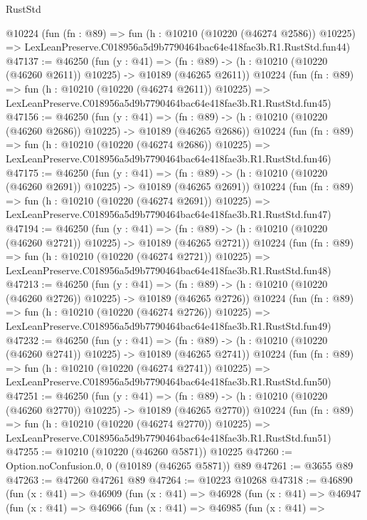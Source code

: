 \begin{lexlean}{RustStd}
\begin{coremodule}
    @10224
    (fun (fn : @89) =>
    fun (h : @10210 (@10220 (@46274 @2586)) @10225) =>
    LexLeanPreserve.C018956a5d9b7790464bac64e418fae3b.R1.RustStd.fun44)
@47137 := @46250
    (fun (y : @41) =>
    (fn : @89) -> (h : @10210 (@10220 (@46260 @2611)) @10225) -> @10189 (@46265 @2611))
    @10224
    (fun (fn : @89) =>
    fun (h : @10210 (@10220 (@46274 @2611)) @10225) =>
    LexLeanPreserve.C018956a5d9b7790464bac64e418fae3b.R1.RustStd.fun45)
@47156 := @46250
    (fun (y : @41) =>
    (fn : @89) -> (h : @10210 (@10220 (@46260 @2686)) @10225) -> @10189 (@46265 @2686))
    @10224
    (fun (fn : @89) =>
    fun (h : @10210 (@10220 (@46274 @2686)) @10225) =>
    LexLeanPreserve.C018956a5d9b7790464bac64e418fae3b.R1.RustStd.fun46)
@47175 := @46250
    (fun (y : @41) =>
    (fn : @89) -> (h : @10210 (@10220 (@46260 @2691)) @10225) -> @10189 (@46265 @2691))
    @10224
    (fun (fn : @89) =>
    fun (h : @10210 (@10220 (@46274 @2691)) @10225) =>
    LexLeanPreserve.C018956a5d9b7790464bac64e418fae3b.R1.RustStd.fun47)
@47194 := @46250
    (fun (y : @41) =>
    (fn : @89) -> (h : @10210 (@10220 (@46260 @2721)) @10225) -> @10189 (@46265 @2721))
    @10224
    (fun (fn : @89) =>
    fun (h : @10210 (@10220 (@46274 @2721)) @10225) =>
    LexLeanPreserve.C018956a5d9b7790464bac64e418fae3b.R1.RustStd.fun48)
@47213 := @46250
    (fun (y : @41) =>
    (fn : @89) -> (h : @10210 (@10220 (@46260 @2726)) @10225) -> @10189 (@46265 @2726))
    @10224
    (fun (fn : @89) =>
    fun (h : @10210 (@10220 (@46274 @2726)) @10225) =>
    LexLeanPreserve.C018956a5d9b7790464bac64e418fae3b.R1.RustStd.fun49)
@47232 := @46250
    (fun (y : @41) =>
    (fn : @89) -> (h : @10210 (@10220 (@46260 @2741)) @10225) -> @10189 (@46265 @2741))
    @10224
    (fun (fn : @89) =>
    fun (h : @10210 (@10220 (@46274 @2741)) @10225) =>
    LexLeanPreserve.C018956a5d9b7790464bac64e418fae3b.R1.RustStd.fun50)
@47251 := @46250
    (fun (y : @41) =>
    (fn : @89) -> (h : @10210 (@10220 (@46260 @2770)) @10225) -> @10189 (@46265 @2770))
    @10224
    (fun (fn : @89) =>
    fun (h : @10210 (@10220 (@46274 @2770)) @10225) =>
    LexLeanPreserve.C018956a5d9b7790464bac64e418fae3b.R1.RustStd.fun51)
@47255 := @10210 (@10220 (@46260 @5871)) @10225
@47260 := Option.noConfusion.{0, 0} (@10189 (@46265 @5871)) @89
@47261 := @3655 @89
@47263 := @47260 @47261 @89
@47264 := @10223 @10268
@47318 := @46890
    (fun (x : @41) =>
    @46909
      (fun (x : @41) =>
      @46928
        (fun (x : @41) =>
        @46947
          (fun (x : @41) =>
          @46966
            (fun (x : @41) =>
            @46985
              (fun (x : @41) =>

\end{coremodule}
\end{lexlean}
